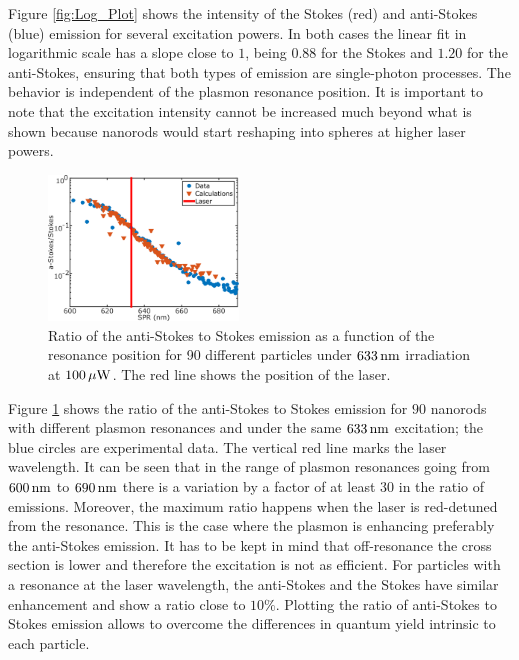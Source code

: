 Figure \ref{fig:Log_Plot} shows the intensity of the Stokes (red) and
anti-Stokes (blue) emission for several excitation powers. In both cases the
linear fit in logarithmic scale has a slope close to $1$, being $0.88$ for the
Stokes and $1.20$ for the anti-Stokes, ensuring that both types of emission are
single-photon processes. The behavior is independent of the plasmon resonance
position. It is important to note that the excitation intensity cannot be
increased much beyond what is shown because nanorods would start reshaping into
spheres at higher laser powers.

\begin{figure}[htp] \centering
\includegraphics[width=0.45\textwidth]{Chapters/04_Anti-Stokes/Figures/Supplementary/02_AS_vs_S_SPR/02_AS_vs_S_SPR.png}
\caption{Ratio of the anti-Stokes to Stokes emission as a function of the
resonance position for 90 different particles under $633\,\textrm{nm}$
irradiation at $100\,\mu\textrm{W}$. The red line shows the position of the laser.}
	\label{fig:ASS-ratio}
\end{figure}

Figure \ref{fig:ASS-ratio} shows the ratio of the anti-Stokes to Stokes emission
for $90$ nanorods with different plasmon resonances and under the same $633\,\textrm{nm}$
excitation; the blue circles are experimental data. The vertical red line marks
the laser wavelength. It can be seen that in the range of plasmon resonances
going from $600\,\textrm{nm}$ to $690\,\textrm{nm}$ there is a variation by a factor of at least
$30$ in the ratio of emissions. Moreover, the maximum ratio happens when the
laser is red-detuned from the resonance. This is the case where the plasmon is
enhancing preferably the anti-Stokes emission. It has to be kept in mind that
off-resonance the cross section is lower and therefore the excitation is not as
efficient. For particles with a resonance at the laser wavelength, the
anti-Stokes and the Stokes have similar enhancement and show a ratio close to
$10\%$. Plotting the ratio of anti-Stokes to Stokes emission allows to overcome
the differences in quantum yield intrinsic to each
particle\cite{Fang2012,Rao2015,Yorulmaz2012,Cheng2015,Dulkeith2004}.

